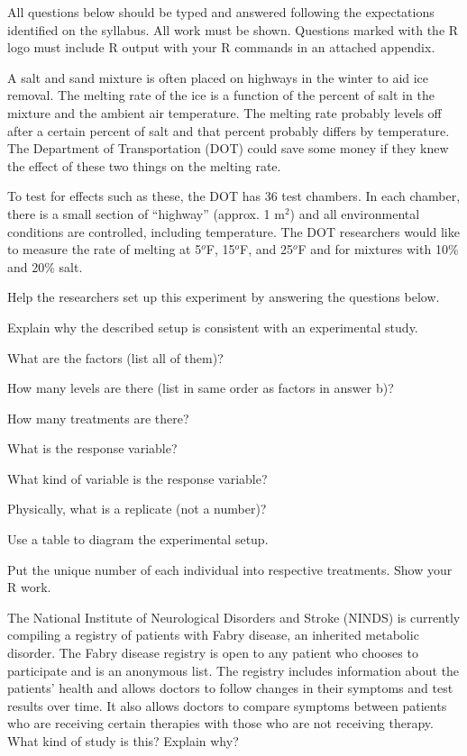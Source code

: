 \documentclass[10pt,openany]{book}\usepackage[]{graphicx}\usepackage[]{color}
\begin{document}
\newpage
\begin{hwsection}{All questions below should be typed and answered following the expectations identified on the syllabus.  All work must be shown.  Questions marked with the R logo must include R output with your R commands in an attached appendix.}

  \item \label{hwprob:DataIce} A salt and sand mixture is often placed on highways in the winter to aid ice removal. The melting rate of the ice is a function of the percent of salt in the mixture and the ambient air temperature. The melting rate probably levels off after a certain percent of salt and that percent probably differs by temperature. The Department of Transportation (DOT) could save some money if they knew the effect of these two things on the melting rate.

  To test for effects such as these, the DOT has 36 test chambers. In each chamber, there is a small section of ``highway'' (approx. 1 m$^{2}$) and all environmental conditions are controlled, including temperature.  The DOT researchers would like to measure the rate of melting at 5$^{o}$F, 15$^{o}$F, and 25$^{o}$F and for mixtures with 10\% and 20\% salt.

  Help the researchers set up this experiment by answering the questions below.

  \begin{Enumerate}
    \item Explain why the described setup is consistent with an experimental study.
    \item What are the factors (list all of them)?
    \item How many levels are there (list in same order as factors in answer b)?
    \item How many treatments are there?
    \item What is the response variable?
    \item What kind of variable is the response variable?
    \item Physically, what is a replicate (not a number)?
    \item Use a table to diagram the experimental setup.
    \item \rhw{} Put the unique number of each individual into respective treatments.  Show your R work.
  \end{Enumerate}

  \item \label{hwprob:DataFabry} The National Institute of Neurological Disorders and Stroke (NINDS) is currently compiling a registry of patients with Fabry disease, an inherited metabolic disorder. The Fabry disease registry is open to any patient who chooses to participate and is an anonymous list.  The registry includes information about the patients' health and allows doctors to follow changes in their symptoms and test results over time.  It also allows doctors to compare symptoms between patients who are receiving certain therapies with those who are not receiving therapy.  What kind of study is this?  Explain why?
\end{hwsection}
\end{document}
